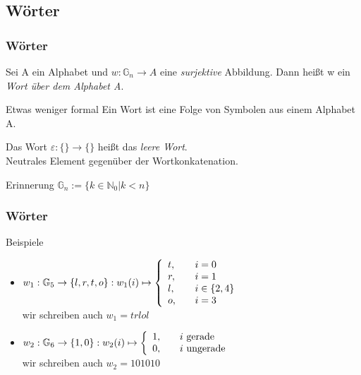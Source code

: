 \documentclass{beamer}
\begin{document}
\subsection{Wörter}
\begin{frame}
  \frametitle{Wörter}
  \begin{definition}
    Sei A ein Alphabet und $w: \mathbb{G}_n \rightarrow A$ eine \emph{surjektive} Abbildung. Dann heißt w ein \emph{Wort über dem Alphabet A}.
  \end{definition}\pause
  \begin{alertblock}{Etwas weniger formal}
    Ein Wort ist eine Folge von Symbolen aus einem Alphabet A.
  \end{alertblock}\pause
  \begin{definition}
    Das Wort $\varepsilon: \{\} \rightarrow \{\}$ heißt das \emph{leere Wort}. \\
    {\tiny Neutrales Element gegenüber der Wortkonkatenation.}
  \end{definition}\pause
  \begin{alertblock}{Erinnerung}
    $\mathbb{G}_n :=  \{k \in \mathbb{N}_0 | k < n\}$
  \end{alertblock}
\end{frame}
\begin{frame}
  \frametitle{Wörter}
  \begin{exampleblock}{Beispiele}
    \begin{itemize}
      \item
      $
        w_1: \mathbb{G}_5 \rightarrow \{l, r, t, o\}: w_1(i) \mapsto \left\{
        \begin{array}{l l}
          t, & \quad i = 0\\
          r, & \quad i = 1\\
          l, & \quad i \in \{2, 4\}\\
          o, & \quad i = 3\\
        \end{array} \right.
      $ \\
      wir schreiben auch $w_1 = trlol$
      \item
      $
        w_2: \mathbb{G}_6 \rightarrow \{1, 0\}: w_2(i) \mapsto \left\{
        \begin{array}{l l}
          1, & \quad \text{$i$ gerade}\\
          0, & \quad \text{$i$ ungerade}\\
        \end{array} \right.
      $ \\
      wir schreiben auch $w_2 = 101010$
    \end{itemize}
  \end{exampleblock}
\end{frame}
\end{document}
